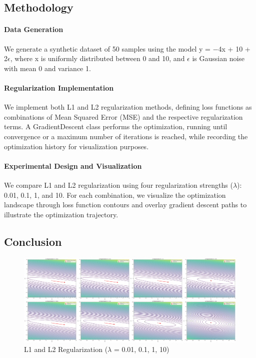 \documentclass{article}
\begin{document}
\subsection{Methodology}
\paragraph{Data Generation}
We generate a synthetic dataset of 50 samples using the model y = −4x + 10 + 2$\epsilon$, where x is uniformly distributed between 0 and 10, and $\epsilon$ is Gaussian noise with mean 0 and variance 1.

\paragraph{Regularization Implementation}
We implement both L1 and L2 regularization methods, defining loss functions as combinations of Mean Squared Error (MSE) and the respective regularization terms. A GradientDescent class performs the optimization, running until convergence or a maximum number of iterations is reached, while recording the optimization history for visualization purposes.

\paragraph{Experimental Design and Visualization}
We compare L1 and L2 regularization using four regularization strengths ($\lambda$): 0.01, 0.1, 1, and 10. For each combination, we visualize the optimization landscape through loss function contours and overlay gradient descent paths to illustrate the optimization trajectory.

\subsection{Conclusion}
\begin{figure}[h]
    \centering
    \begin{minipage}{1\textwidth}
        \centering
        \includegraphics[width=\textwidth]{figures/T4.png} 
        \caption{L1 and L2 Regularization ($\lambda$ = 0.01, 0.1, 1, 10)}
    \end{minipage}
\end{figure}
\end{document}
